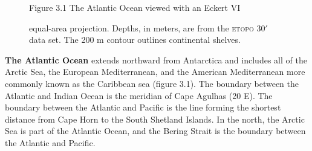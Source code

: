 \begin{figure}[t!]
 \footnotesize
\centering Figure 3.1 The Atlantic Ocean viewed with an Eckert
VI\rule{0mm}{3ex} equal-area projection. Depths, in meters, are
from the \textsc{etopo} 30$'$ data set. The 200 m contour outlines
continental shelves.

\label{fig:atlantic}
\vspace{-4ex}
\end{figure}

\textbf{The Atlantic Ocean} extends
northward from Antarctica and includes all of the Arctic Sea, the
European Mediterranean, and the American Mediterranean more commonly
known as the Caribbean sea (figure 3.1). The boundary between the
Atlantic and Indian Ocean is the meridian of Cape Agulhas (20\degrees
E). The boundary between the Atlantic and Pacific is the line forming
the shortest distance from Cape Horn to the South Shetland Islands. In
the north, the Arctic Sea is part of the Atlantic Ocean, and the
Bering Strait is the boundary between the Atlantic and Pacific.

